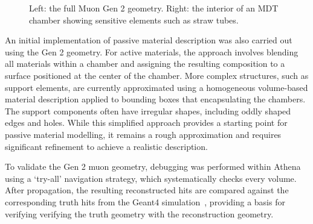 \begin{figure}[htp]
  \centering
  \hfill
  \caption{Left: the full Muon Gen 2 geometry. Right: the interior of an MDT chamber showing sensitive elements such as straw tubes.}\label{fig:reco_acts_muon_and_sensitives_gen2}
\end{figure}

An initial implementation of passive material description was also carried out using the Gen 2 geometry. For active materials, the approach involves blending all materials within a chamber and assigning the resulting composition to a surface positioned at the center of the chamber. More complex structures, such as support elements, are currently approximated using a homogeneous volume-based material description applied to bounding boxes that encapsulating the chambers. The support components often have irregular shapes, including oddly shaped edges and holes. While this simplified approach provides a starting point for passive material modelling, it remains a rough approximation and requires significant refinement to achieve a realistic description.

To validate the Gen 2 muon geometry, debugging was performed within Athena using a `try-all' navigation strategy, which systematically checks every volume. After propagation, the resulting reconstructed hits are compared against the corresponding truth hits from the Geant4 simulation~\cite{Agostinelli:2002hh}, providing a basis for verifying verifying the truth geometry with the reconstruction geometry.
